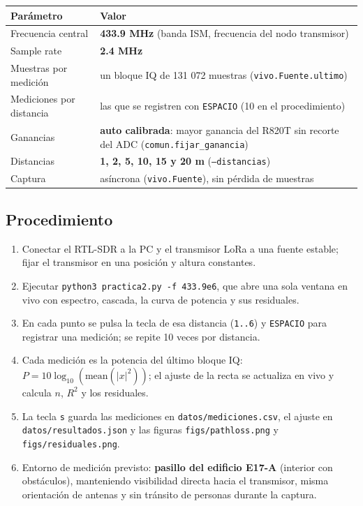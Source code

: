 \documentclass[11pt,a4paper]{article}
\begin{document}
\begin{tabularx}{\linewidth}{@{}*{2}{>{\raggedright\arraybackslash}X}@{}}
\toprule
Parámetro & Valor \\
\midrule
Frecuencia central & \textbf{433.9 MHz} (banda ISM, frecuencia del nodo transmisor) \\
Sample rate & \textbf{2.4 MHz} \\
Muestras por medición & un bloque IQ de 131 072 muestras (\texttt{vivo.Fuente.ultimo}) \\
Mediciones por distancia & las que se registren con \texttt{ESPACIO} (10 en el procedimiento) \\
Ganancias & \textbf{auto calibrada}: mayor ganancia del R820T sin recorte del ADC (\texttt{comun.fijar\_ganancia}) \\
Distancias & \textbf{1, 2, 5, 10, 15 y 20 m} (\texttt{--distancias}) \\
Captura & asíncrona (\texttt{vivo.Fuente}), sin pérdida de muestras \\
\bottomrule
\end{tabularx}

\subsection{Procedimiento}

\begin{enumerate}
  \item Conectar el RTL-SDR a la PC y el transmisor LoRa a una fuente estable; fijar el transmisor en una posición y altura constantes.
  \item Ejecutar \texttt{python3 practica2.py -f 433.9e6}, que abre una sola ventana en vivo con espectro, cascada, la curva de potencia y sus residuales.
  \item En cada punto se pulsa la tecla de esa distancia (\texttt{1..6}) y \texttt{ESPACIO} para registrar una medición; se repite 10 veces por distancia.
  \item Cada medición es la potencia del último bloque IQ: $P=10\log_{10}\!\left(\text{mean}(|x|^2)\right)$; el ajuste de la recta se actualiza en vivo y calcula $n$, $R^2$ y los residuales.
  \item La tecla \texttt{s} guarda las mediciones en \texttt{datos/mediciones.csv}, el ajuste en \texttt{datos/resultados.json} y las figuras \texttt{figs/pathloss.png} y \texttt{figs/residuales.png}.
  \item Entorno de medición previsto: \textbf{pasillo del edificio E17-A} (interior con obstáculos), manteniendo visibilidad directa hacia el transmisor, misma orientación de antenas y sin tránsito de personas durante la captura.
\end{enumerate}
\end{document}
